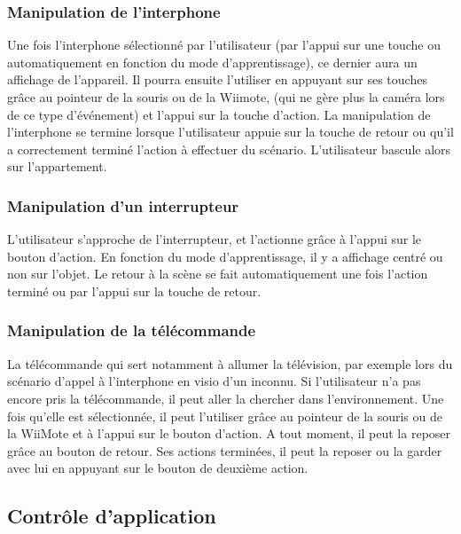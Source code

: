 \subsubsection{Manipulation de l’interphone }
Une fois l’interphone sélectionné par l’utilisateur (par l’appui sur une touche ou automatiquement en fonction du mode d’apprentissage), ce dernier aura un affichage de l’appareil. Il pourra ensuite l’utiliser en appuyant sur ses touches grâce au pointeur de la souris ou de la Wiimote, (qui ne gère plus la caméra lors de ce type d’événement) et l’appui sur la touche d’action. La manipulation de l’interphone se termine lorsque l’utilisateur appuie sur la touche de retour ou qu’il a correctement terminé l’action à effectuer du scénario. L’utilisateur bascule alors sur l’appartement.

\subsubsection{Manipulation d’un interrupteur}
L’utilisateur s’approche de l’interrupteur, et l’actionne grâce à l’appui sur le bouton d’action. En fonction du mode d’apprentissage, il y a affichage centré ou non sur l’objet. Le retour à la scène se fait automatiquement une fois l’action terminé ou par l’appui sur la touche de retour.

\subsubsection{Manipulation de la télécommande}

La télécommande qui sert notamment à allumer la télévision, par exemple lors du scénario d'appel à l'interphone en visio d'un inconnu. Si l’utilisateur n’a pas encore pris la télécommande, il peut aller la chercher dans l’environnement. Une fois qu’elle est sélectionnée, il peut l’utiliser grâce au pointeur de la souris ou de la WiiMote et à l’appui sur le bouton d’action. A tout moment, il peut la reposer grâce au bouton de retour. Ses actions terminées, il peut la reposer ou la garder avec lui en appuyant sur le bouton de deuxième action. 

\subsection{Contrôle d’application}
